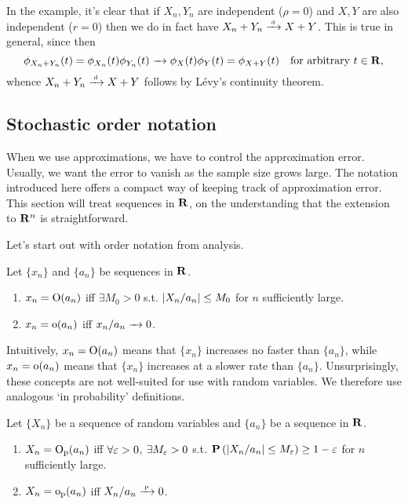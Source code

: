 \documentclass[11pt,letterpaper,reqno,oneside]{article}
\begin{document}
In the example, it's clear that if $X_n,Y_n$ are independent ($\rho=0$) and $X,Y$ are also independent ($r=0$) then we do in fact have $X_n + Y_n \convd X + Y$. This is true in general, since then
%
\begin{equation*}
	\phi_{X_n+Y_n}(t)
	= \phi_{X_n}(t) \phi_{Y_n}(t)
	\conv \phi_X(t) \phi_Y(t)
	= \phi_{X+Y}(t) 
	\quad\text{for arbitrary $t \in \R$} ,
\end{equation*}
%
whence $X_n+Y_n \convd X+Y$ follows by Lévy's continuity theorem.




\subsection{Stochastic order notation}
\label{sec:modes_of_convergence:stochastic_order}

When we use approximations, we have to control the approximation error. Usually, we want the error to vanish as the sample size grows large. The notation introduced here offers a compact way of keeping track of approximation error. This section will treat sequences in $\R$, on the understanding that the extension to $\R^n$ is straightforward.

Let's start out with order notation from analysis.
%
\begin{definition}
	Let $\{ x_n \}$ and $\{ a_n \}$ be sequences in $\R$.
	\begin{enumerate}

		\item $x_n = \OO(a_n)$ iff $\exists M_0 > 0$ s.t. $\abs*{X_n/a_n} \leq M_0$ for $n$ sufficiently large.

		\item $x_n = \oo(a_n)$ iff $x_n/a_n \conv 0$.

	\end{enumerate}	
\end{definition}

Intuitively, $x_n = \OO(a_n)$ means that $\{ x_n \}$ increases no faster than $\{ a_n \}$, while $x_n = \oo(a_n)$ means that $\{ x_n \}$ increases at a slower rate than $\{ a_n \}$. Unsurprisingly, these concepts are not well-suited for use with random variables. We therefore use analogous `in probability' definitions.


\begin{definition}
	Let $\{ X_n \}$ be a sequence of random variables and $\{ a_n \}$ be a sequence in $\R$.
	\begin{enumerate}

		\item $X_n = \Op(a_n)$ iff $\forall \eps>0$, $\exists M_\eps > 0$ s.t. $\PP\left( \abs*{X_n/a_n} \leq M_\eps \right) \geq 1-\eps$ for $n$ sufficiently large.

		\item $X_n = \op(a_n)$ iff $X_n/a_n \convp 0$.

	\end{enumerate}	
\end{definition}
\end{document}
